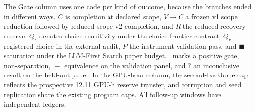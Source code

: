 The Gate column uses one code per kind of outcome, because the branches ended in different ways. $C$ is completion at declared scope, $V\!\to\!C$ a frozen v1 scope reduction followed by reduced-scope v2 completion, and $R$ the reduced recovery reserve. $Q_s$ denotes choice sensitivity under the choice-frontier contract, $Q_r$ registered choice in the external audit, $P$ the instrument-validation pass, and $\blacksquare$ saturation under the LLM-First Search paper budget. \cmark\ marks a positive gate, $=$ non-separation, $\equiv$ equivalence on the validation panel, and $?$ an inconclusive result on the held-out panel. In the GPU-hour column, the second-backbone cap reflects the prospective 12.11 GPU-h reserve transfer, and corruption and seed replication share the existing program caps. All follow-up windows have independent ledgers.

